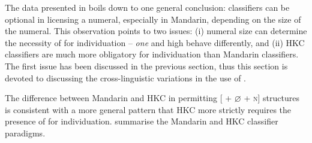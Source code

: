 \documentclass[output=paper]{langsci/langscibook}
\begin{document}
The data presented in  boils down to one general conclusion:
classifiers can be optional in licensing a numeral, especially in
Mandarin, depending on the size of the numeral. This
observation points to two issues: (i) numeral size can determine
the necessity of  for individuation -- \emph{one} and high
 behave differently, and (ii) \gls{HKC} classifiers are much more
obligatory for individuation than Mandarin classifiers. The first issue has
been discussed in the previous section, thus this section is devoted to
discussing the cross-linguistic variations in the use of .

The difference between Mandarin and \gls{HKC} in permitting [\Num{} +
${\varnothing}$ + \textsc{n}] structures is consistent with a more general pattern that
\gls{HKC} more strictly requires the presence of  for individuation.
 summarise the Mandarin and \gls{HKC} classifier
paradigms.
\end{document}
